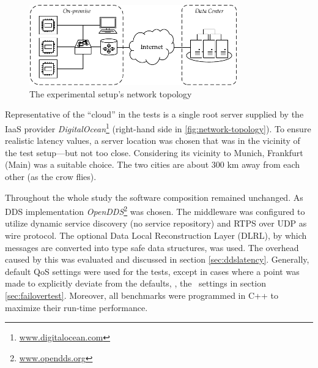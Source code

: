\begin{figure}[htpb]
  \centering
  \includegraphics[width=0.8\textwidth]{figures/network-setup}
  \caption[Network topology of the experimental setup]{The experimental setup's network topology}\label{fig:network-topology}
\end{figure}
%
Representative of the ``cloud'' in the tests is a single root server supplied by the IaaS provider \emph{DigitalOcean}\footnote{\url{www.digitalocean.com}} (right-hand side in \autoref{fig:network-topology}). To ensure realistic latency values, a server location was chosen that was in the vicinity of the test setup---but not too close. Considering its vicinity to Munich, Frankfurt (Main) was a suitable choice. The two cities are about 300 km away from each other (as the crow flies).

Throughout the whole study the software composition remained unchanged. As DDS implementation \emph{OpenDDS}\footnote{\url{www.opendds.org}} was chosen. The middleware was configured to utilize dynamic service discovery (no service repository) and RTPS over UDP as wire protocol. The optional Data Local Reconstruction Layer (DLRL), by which messages are converted into type safe data structures, was used. The overhead caused by this was evaluated and discussed in section \ref{sec:ddslatency}. Generally, default QoS settings were used for the tests, except in cases where a point was made to explicitly deviate from the defaults, \eg , the \liveliness\ settings in section \ref{sec:failovertest}. Moreover, all benchmarks were programmed in C++ to maximize their run-time performance.

